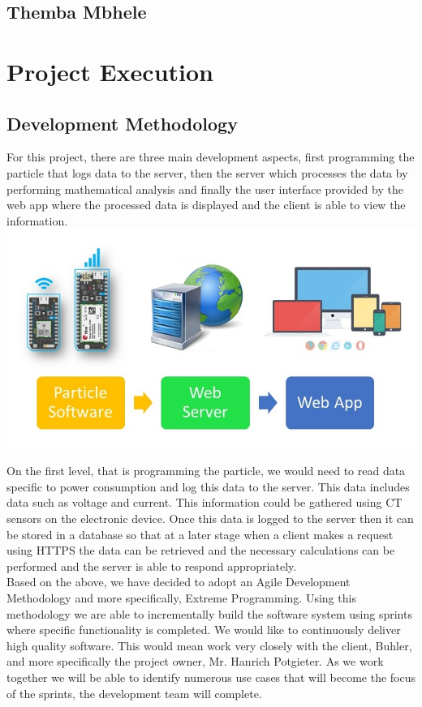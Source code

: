 \documentclass{scrartcl}
\begin{document}
\subsection{Themba Mbhele}

\section{Project Execution}
\subsection{Development Methodology}
For this project, there are three main development aspects, first programming the particle that logs data to the server, then the server which processes the data by performing mathematical analysis and finally the user interface provided by the web app where the processed data is displayed and the client is able to view the information.\\


\includegraphics[width=\textwidth]{pcDevMeth.jpg}

On the first level, that is programming the particle, we would need to read data specific to power consumption and log this data to the server. This data includes data such as voltage and current. This information could be gathered using CT sensors on the electronic device. Once this data is logged to the server then it can be stored in a database so that at a later stage when a client makes a request using HTTPS the data can be retrieved and the necessary calculations can be performed and the server is able to respond appropriately. \\

Based on the above, we have decided to adopt an Agile Development Methodology and more specifically, Extreme Programming. Using this methodology we are able to incrementally build the software system using sprints where specific functionality is completed. We would like to continuously deliver high quality software. This would mean work very closely with the client, Buhler, and more specifically the project owner, Mr. Hanrich Potgieter. As we work together we will be able to identify numerous use cases that will become the focus of the sprints, the development team will complete. \\
\end{document}
